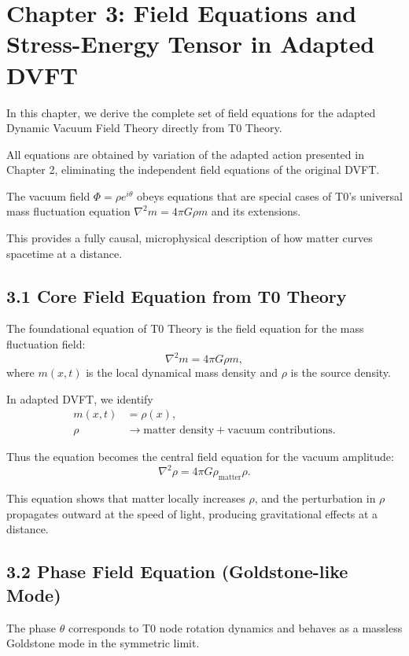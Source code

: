 \documentclass[12pt,a4paper]{article}
\begin{document}
	\section{Chapter 3: Field Equations and Stress-Energy Tensor in Adapted DVFT}
	
	In this chapter, we derive the complete set of field equations for the adapted Dynamic Vacuum Field Theory directly from T0 Theory.
	
	All equations are obtained by variation of the adapted action presented in Chapter 2, eliminating the independent field equations of the original DVFT.
	
	The vacuum field $\Phi = \rho e^{i\theta}$ obeys equations that are special cases of T0's universal mass fluctuation equation $\nabla^2 m = 4\pi G \rho m$ and its extensions.
	
	This provides a fully causal, microphysical description of how matter curves spacetime at a distance.
	
	\subsection{3.1 Core Field Equation from T0 Theory}
	
	The foundational equation of T0 Theory is the field equation for the mass fluctuation field:
	\[
	\nabla^2 m = 4\pi G \rho m,
	\]
	where $m(x,t)$ is the local dynamical mass density and $\rho$ is the source density.
	
	In adapted DVFT, we identify
	\begin{align}
		m(x,t) &= \rho(x), \\
		\rho &\to \text{matter density} + \text{vacuum contributions}.
	\end{align}
	
	Thus the equation becomes the central field equation for the vacuum amplitude:
	\[
	\nabla^2 \rho = 4\pi G \rho_{\text{matter}} \rho.
	\]
	
	This equation shows that matter locally increases $\rho$, and the perturbation in $\rho$ propagates outward at the speed of light, producing gravitational effects at a distance.
	
	\subsection{3.2 Phase Field Equation (Goldstone-like Mode)}
	
	The phase $\theta$ corresponds to T0 node rotation dynamics and behaves as a massless Goldstone mode in the symmetric limit.
	
\end{document}
